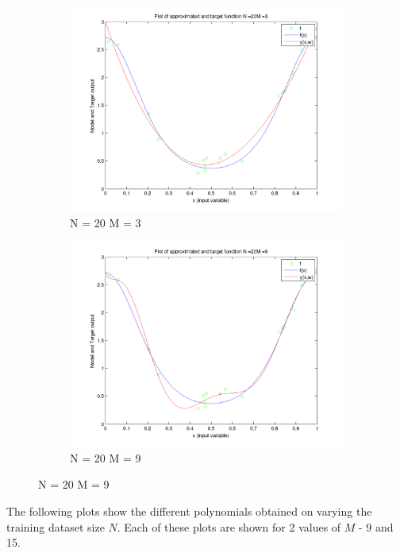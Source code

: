 \documentclass{article}
\begin{document}
\begin{figure}[hbtp]
\begin{subfigure}{.5\textwidth}
\centering
\includegraphics[width=\linewidth]{../Code/Plots_1/Varying_M/VaryingM_N20M3.png}
\caption{N = 20 M = 3}
\end{subfigure}
\begin{subfigure}{.5\textwidth}
\includegraphics[width=\linewidth]{../Code/Plots_1/Varying_M/VaryingM_N20M9.png}
\caption{N = 20 M = 9}
\end{subfigure}



\end{figure}


The following plots show the different polynomials obtained on varying the training dataset size $N$. Each of these plots are shown for 2 values of $M$ - 9 and 15.
\end{document}
